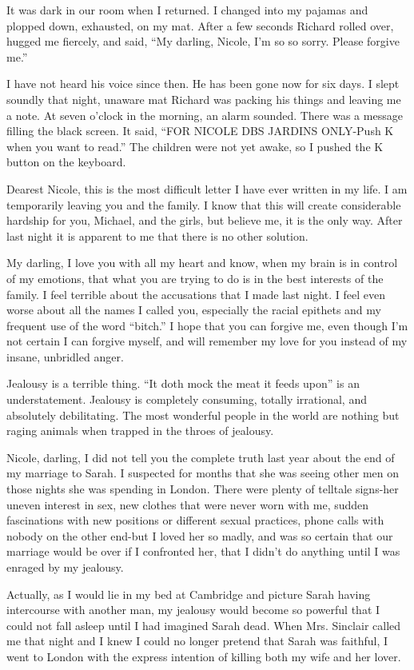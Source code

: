 \documentclass[]{article}
\begin{document}
It was dark in our room when I returned. I changed into my pajamas and plopped down, exhausted, on my mat. After a few seconds Richard rolled over, hugged me fiercely, and said, “My darling, Nicole, I’m so so sorry. Please forgive me.”

I have not heard his voice since then. He has been gone now for six days. I slept soundly that night, unaware mat Richard was packing his things and leaving me a note. At seven o’clock in the morning, an alarm sounded. There was a message filling the black screen. It said, “FOR NICOLE DBS JARDINS ONLY-Push K when you want to read.” The children were not yet awake, so I pushed the K button on the keyboard.

Dearest Nicole, this is the most difficult letter I have ever written in my life. I am temporarily leaving you and the family. I know that this will create considerable hardship for you, Michael, and the girls, but believe me, it is the only way. After last night it is apparent to me that there is no other solution.

My darling, I love you with all my heart and know, when my brain is in control of my emotions, that what you are trying to do is in the best interests of the family. I feel terrible about the accusations that I made last night. I feel even worse about all the names I called you, especially the racial epithets and my frequent use of the word “bitch.” I hope that you can forgive me, even though I’m not certain I can forgive myself, and will remember my love for you instead of my insane, unbridled anger.

Jealousy is a terrible thing. “It doth mock the meat it feeds upon” is an understatement. Jealousy is completely consuming, totally irrational, and absolutely debilitating. The most wonderful people in the world are nothing but raging animals when trapped in the throes of jealousy.

Nicole, darling, I did not tell you the complete truth last year about the end of my marriage to Sarah. I suspected for months that she was seeing other men on those nights she was spending in London. There were plenty of telltale signs-her uneven interest in sex, new clothes that were never worn with me, sudden fascinations with new positions or different sexual practices, phone calls with nobody on the other end-but I loved her so madly, and was so certain that our marriage would be over if I confronted her, that I didn’t do anything until I was enraged by my jealousy.

Actually, as I would lie in my bed at Cambridge and picture Sarah having intercourse with another man, my jealousy would become so powerful that I could not fall asleep until I had imagined Sarah dead. When Mrs. Sinclair called me that night and I knew I could no longer pretend that Sarah was faithful, I went to London with the express intention of killing both my wife and her lover.
\end{document}
